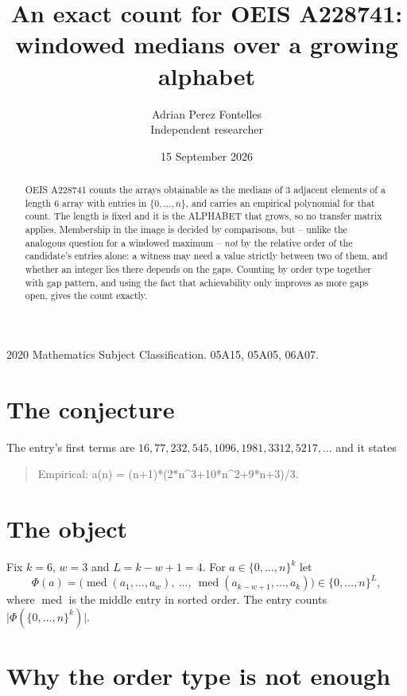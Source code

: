 \documentclass[11pt,a4paper]{article}
\title{An exact count for OEIS A228741: windowed medians over a growing alphabet}
\author{Adrian Perez Fontelles\\ \small Independent researcher}
\date{15 September 2026}
\theoremstyle{plain}
\theoremstyle{definition}
\begin{document}
\maketitle

\begin{abstract}
OEIS A228741 counts the arrays obtainable as the medians of $3$ adjacent elements of a length
$6$ array with entries in $\{0,\dots,n\}$, and carries an empirical polynomial for that
count. The length is fixed and it is the ALPHABET that grows, so no transfer matrix applies.
Membership in the image is decided by comparisons, but -- unlike the analogous question for a
windowed maximum -- \emph{not} by the relative order of the candidate's entries alone: a
witness may need a value strictly between two of them, and whether an integer lies there depends
on the gaps. Counting by order type together with gap pattern, and using the fact that
achievability only improves as more gaps open, gives the count exactly.
\end{abstract}

\noindent\small 2020 Mathematics Subject Classification. 05A15, 05A05, 06A07.\normalsize

\section{The conjecture}

The entry's first terms are $16, 77, 232, 545, 1096, 1981, 3312, 5217,\dots$ and it states

\begin{quote}\raggedright Empirical: a(n) = (n+1)*(2*n\^{}3+10*n\^{}2+9*n+3)/3.\end{quote}

\section{The object}

Fix $k=6$, $w=3$ and $L=k-w+1=4$. For $a\in\{0,\dots,n\}^k$ let
\[
  \Phi(a)=\bigl(\operatorname{med}(a_1,\dots,a_w),\ \dots,\
  \operatorname{med}(a_{k-w+1},\dots,a_k)\bigr)\in\{0,\dots,n\}^{L} ,
\]
where $\operatorname{med}$ is the middle entry in sorted order. The entry counts
$\lvert\Phi(\{0,\dots,n\}^k)\rvert$.

\section{Why the order type is not enough}
\end{document}
